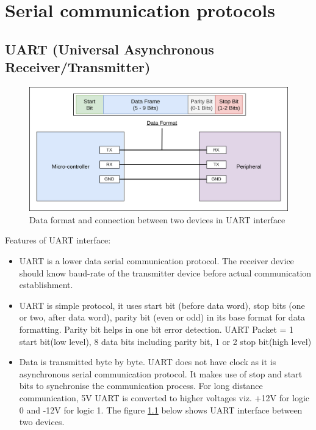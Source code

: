 \clearpage
\chapter{Serial communication protocols} \label{Basics_motor_control}

\section{UART (Universal Asynchronous Receiver/Transmitter)}

\begin{figure}[h!]
\centering
\includegraphics[width=14cm]{./Figures/UART.png}
\caption{Data format and connection between two devices in UART interface}
\label{UART}
\end{figure}

Features of UART interface:
\begin{itemize}
    \item UART is a lower data serial communication protocol. The receiver device should know baud-rate of the transmitter device before actual communication establishment.
    \item UART is simple protocol, it uses start bit (before data word), stop bits (one or two, after data word), parity bit (even or odd) in its base format for data formatting. Parity bit helps in one bit error detection. UART Packet = 1 start bit(low level), 8 data bits including parity bit, 1 or 2 stop bit(high level)
    \item Data is transmitted byte by byte. UART does not have clock as it is asynchronous serial communication protocol. It makes use of stop and start bits to synchronise the communication process. For long distance communication, 5V UART is converted to higher voltages viz. +12V for logic 0 and -12V for logic 1. The figure \ref{UART} below shows UART interface between two devices.
    
    
\end{itemize}

